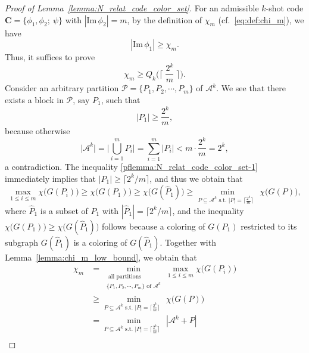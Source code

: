 \documentclass[11pt,draftclsnofoot,onecolumn]{IEEEtran}
\newcommand{\mbC}{\mathbf{C}}
\def\Im{\mathrm{Im}}
\begin{document}
\begin{proof}[Proof of Lemma~\ref{lemma:N_relat_code_color_set}]
For an admissible $k$-shot code $\mbC=\big\{\phi_1,\phi_2;~\psi\big\}$ with $|\Im\,\phi_2|=m$, by the definition of $\chi_{m}$ (cf.~\eqref{eq:def:chi_m}), we have
 \begin{equation*}
|\Im\,\phi_{1}|\geq\chi_{m}.
 \end{equation*}
Thus, it  suffices to prove
\begin{equation*}
\chi_{m}\geq Q_{k}\Big(\Big\lceil\;\frac{2^{k}}{m}\;\Big\rceil\Big).
\end{equation*}
 Consider an arbitrary partition $\mathcal{P}=\{P_1,P_2,\cdots,P_m\}$ of  $\mathcal{A}^{k}$. We see that there exists a block in $\mathcal{P}$, say $P_1$, such that
\begin{equation}
|P_1|\geq \frac{2^k}{m},\label{pflemma:N_relat_code_color_set-1}
\end{equation}
 because otherwise
 \begin{equation*}
 \big|\mathcal{A}^k\big|=\bigg|\bigcup_{i=1}^{m}P_i\bigg|=\sum_{i=1}^{m}|P_i|<m\cdot\frac{2^k}{m}=2^k,
 \end{equation*}
a contradiction.
The inequality \eqref{pflemma:N_relat_code_color_set-1} immediately implies that
$|P_1|\geq \big\lceil2^{k}/m\big\rceil$, and  thus we obtain that
\begin{equation}
\max_{1\leq i\leq m}\chi\big(G(P_i)\big)\geq \chi\big(G(P_1)\big)\geq \chi\big(G(\widehat{P}_1)\big) \geq\min_{\text{$P\subseteq\mathcal{A}^{k}$ s.t. $|P|=\big\lceil\frac{2^{k}}{m}\big\rceil$ }}\chi\big(G(P)\big),\label{pflemma:N_relat_code_color_set-2}
\end{equation}
where $\widehat{P}_1$ is a subset of $P_1$ with $|\widehat{P}_1|= \big\lceil2^{k}/m\big\rceil$, and
the inequality $\chi\big(G(P_1)\big)\geq \chi\big(G(\widehat{P}_1)\big)$  follows because a coloring of $G(P_1)$ restricted to its subgraph $G(\widehat{P}_1)$ is a coloring of $G(\widehat{P}_1)$.
Together with Lemma~\ref{lemma:chi_m_low_bound}, we obtain that
\begin{align}
\chi_{m}&=\min_{\substack{\text{ all partitions }\\\text{$\{P_1,P_2,\cdots,P_m\}$ of $\mathcal{A}^{k}$}}}\max_{1\leq i\leq m}\chi\big(G(P_i)\big)\nonumber\\
&\geq\min_{\text{$P\subseteq\mathcal{A}^{k}$ s.t. $|P|=\big\lceil\frac{2^{k}}{m}\big\rceil$ }}\chi\big(G(P)\big)\label{pflemma:N_relat_code_color_set-3.1}\\
&=\min_{\text{$P\subseteq\mathcal{A}^{k}$ s.t. $|P|=\big\lceil\frac{2^{k}}{m}\big\rceil$ }}|\mathcal{A}^k+P|\label{pflemma:N_relat_code_color_set-3.2}\\

\end{align}
\end{proof}
\end{document}
